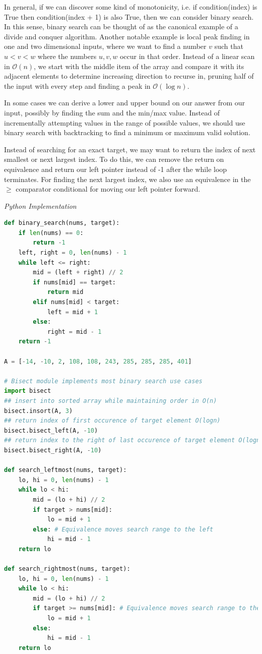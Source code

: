 \documentclass{article}
\newcommand{\bigO}{\mathcal{O}}
\begin{document}
    In general, if we can discover some kind of monotonicity, i.e. if condition(index) is True then condition(index + 1) is also True, then we can consider binary search. In this sense, binary search can be thought of as the canonical example of a divide and conquer algorithm. Another notable example is local peak finding in one and two dimensional inputs, where we want to find a number $v$ such that $u < v < w$ where the numbers $u,v,w$ occur in that order. Instead of a linear scan in $\bigO(n)$, we start with the middle item of the array and compare it with its adjacent elements to determine increasing direction to recurse in, pruning half of the input with every step and finding a peak in $\bigO(\log n)$.
    
    In some cases we can derive a lower and upper bound on our answer from our input, possibly by finding the sum and the min/max value. Instead of incrementally attempting values in the range of possible values, we should use binary search with backtracking to find a minimum or maximum valid solution.
    
    Instead of searching for an exact target, we may want to return the index of next smallest or next largest index. To do this, we can remove the return on equivalence and return our left pointer instead of -1 after the while loop terminates. For finding the next largest index, we also use an equivalence in the $\geq$ comparator conditional for moving our left pointer forward.
    
\vspace{8pt} \emph{Python Implementation}
\begin{lstlisting}[language=Python]
def binary_search(nums, target):
    if len(nums) == 0:
        return -1
    left, right = 0, len(nums) - 1
    while left <= right:
        mid = (left + right) // 2
        if nums[mid] == target:
            return mid
        elif nums[mid] < target:
            left = mid + 1
        else: 
            right = mid - 1
    return -1

A = [-14, -10, 2, 108, 108, 243, 285, 285, 285, 401]

# Bisect module implements most binary search use cases
import bisect
## insert into sorted array while maintaining order in O(n)
bisect.insort(A, 3)
## return index of first occurence of target element O(logn)
bisect.bisect_left(A, -10)
## return index to the right of last occurence of target element O(logn)
bisect.bisect_right(A, -10)

def search_leftmost(nums, target):
    lo, hi = 0, len(nums) - 1
    while lo < hi:
        mid = (lo + hi) // 2
        if target > nums[mid]:
            lo = mid + 1
        else: # Equivalence moves search range to the left
            hi = mid - 1
    return lo
    
def search_rightmost(nums, target):
    lo, hi = 0, len(nums) - 1
    while lo < hi:
        mid = (lo + hi) // 2
        if target >= nums[mid]: # Equivalence moves search range to the right
            lo = mid + 1
        else:
            hi = mid - 1
    return lo 
\end{lstlisting}
    
\end{document}
